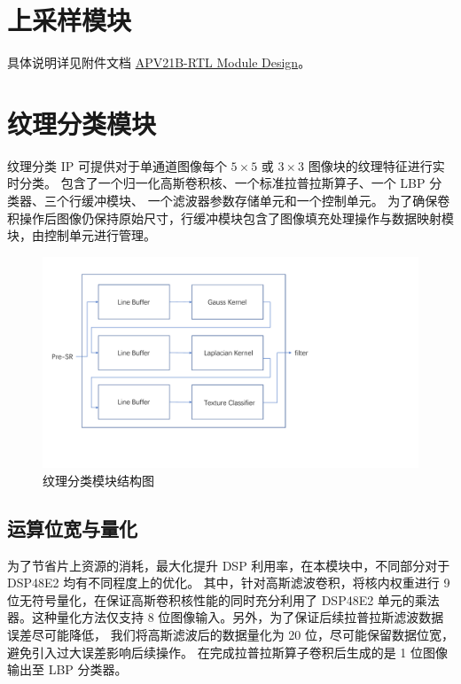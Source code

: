\documentclass[12pt, a4paper, oneside]{ctexbook}
\begin{document}
	\chapter{上采样模块}
	具体说明详见附件文档 \href{./ref/APV21B_RTL_Module_Design.pdf}{APV21B-RTL Module Design}。
	
	\chapter{纹理分类模块}
	纹理分类 IP 可提供对于单通道图像每个 $5\times5$ 或 $3\times3$ 图像块的纹理特征进行实时分类。
	包含了一个归一化高斯卷积核、一个标准拉普拉斯算子、一个 LBP 分类器、三个行缓冲模块、
	一个滤波器参数存储单元和一个控制单元。
	为了确保卷积操作后图像仍保持原始尺寸，行缓冲模块包含了图像填充处理操作与数据映射模块，由控制单元进行管理。

	\begin{figure}[h]
	\centering
	\includegraphics[scale=0.55]{./pic/texture}
	\caption{纹理分类模块结构图}
	\label{fig:texture}
	\end{figure}



	\section{运算位宽与量化}
	为了节省片上资源的消耗，最大化提升 DSP 利用率，在本模块中，不同部分对于 DSP48E2 均有不同程度上的优化。
	其中，针对高斯滤波卷积，将核内权重进行 9 位无符号量化，在保证高斯卷积核性能的同时充分利用了 DSP48E2 
	单元的乘法器。这种量化方法仅支持 8 位图像输入。另外，为了保证后续拉普拉斯滤波数据误差尽可能降低，
	我们将高斯滤波后的数据量化为 20 位，尽可能保留数据位宽，避免引入过大误差影响后续操作。
	在完成拉普拉斯算子卷积后生成的是 1 位图像输出至 LBP 分类器。
\end{document}
